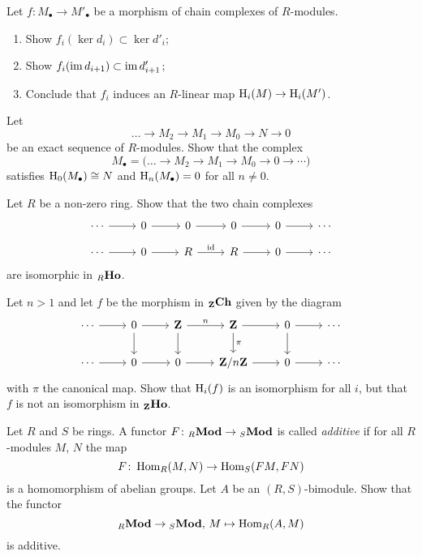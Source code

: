 \begin{exercise}\label{exc:induced-morphism-on-homology}
Let $f\colon M_\bullet \to M'_\bullet$ be a morphism of chain complexes of $R$-modules. 
\begin{enumerate}
\item Show  $f_i(\ker d_i) \subset \ker d'_i$;
\item Show $f_i(\operatorname{im} d_{i+1}) \subset \operatorname{im} d'_{i+1}$;
\item Conclude that $f_i$ induces an $R$-linear map ${\mathrm H}_i(M) \to {\mathrm H}_i(M')$.
\end{enumerate}
\end{exercise}

\begin{exercise}
Let 
\[
	\ldots \to M_2 \to M_1 \to M_0 \to N \to 0
\]
be an exact sequence of $R$-modules. Show that the complex
\[
	M_\bullet = \big( \ldots \to M_2 \to M_1 \to M_0  \to 0 \to \cdots \big)
\]
satisfies ${\mathrm H}_0(M_\bullet)\cong N$ and ${\mathrm H}_n(M_\bullet)=0$ for all $n\neq 0$.
\end{exercise}


\begin{exercise}\label{exc:an-isomorphism-in-the-homotopy-category}
Let $R$ be a non-zero ring. Show that the  two chain complexes
\[
\begin{tikzcd}[row sep=small]
\cdots \arrow{r}
	& 0 \arrow{r}
	& 0 \arrow{r}
	& 0 \arrow{r}
	& 0 \arrow{r}
	&\cdots \\ 
\cdots \arrow{r}
	& 0 \arrow{r}
	& R \arrow{r}{\id}
	& R \arrow{r}
	& 0 \arrow{r}
	&\cdots
\end{tikzcd}
\]
are isomorphic in ${}_R\mathbf{Ho}$.
\end{exercise}

\begin{exercise}Let $n>1$ and let $f$ be the morphism in ${}_{\mathbf{Z}}\mathbf{Ch}$ given by the diagram
\[
\begin{tikzcd}
\cdots \arrow{r}
	& 0 \arrow{r} \arrow{d}
	& \bZ \arrow{r}{n} \arrow{d}
	& \bZ \arrow{r} \arrow{d}{\pi}
	& 0 \arrow{r} \arrow{d}
	&\cdots \\ 
\cdots \arrow{r}
	& 0 \arrow{r}
	& 0 \arrow{r}
	& \bZ/n\bZ \arrow{r}
	& 0 \arrow{r}
	&\cdots
\end{tikzcd}
\]
with $\pi$ the canonical map. Show that ${\mathrm H}_i(f)$ is an isomorphism for all $i$, but that $f$ is not an isomorphism in ${}_{\mathbf{Z}}\mathbf{Ho}$.
\end{exercise}

\begin{exercise}Let $R$ and $S$ be rings. A functor $F\colon {}_R\mathbf{Mod}\to {}_S\mathbf{Mod}$ is
called \emph{additive} if for all $R$-modules $M$, $N$ the map
\[
	F\colon \operatorname{Hom}_R(M,N) \to \operatorname{Hom}_S(FM,FN)
\]
is a homomorphism of abelian groups.  Let $A$ be an $(R,S)$-bimodule. Show that the functor
\[
	{}_R\mathbf{Mod} \to {}_S\mathbf{Mod},\, M \mapsto \operatorname{Hom}_R(A,M)
\]
is additive.
\end{exercise}

